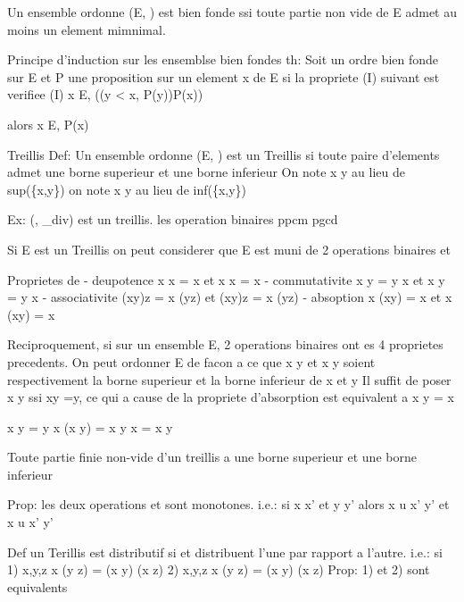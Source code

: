\documentclass{article}
\begin{document}
Un ensemble ordonne (E, \leq) est bien fonde ssi toute partie non vide de E admet au moins un element mimnimal.

Principe d'induction sur les ensemblse bien fondes
th: Soit \leq un ordre bien fonde sur E et P une proposition sur un element x de E
si la propriete (I) suivant est verifiee (I) \forall x \in E, ((\forall y < x, P(y))\rightarrow P(x))

alors \forall x \in E, P(x)



Treillis
Def: Un ensemble ordonne (E, \leq) est un Treillis si toute paire d'elements admet une borne superieur et une borne inferieur
On note x \sqcup y au lieu de sup(\{x,y\})
on note x \sqcap y au lieu de inf(\{x,y\})

Ex: (\N, \leq_{div}) est un treillis.
les operation binaires 
\sqcup ppcm
\sqcap pgcd
 


Si E est un Treillis on peut considerer que E est muni de 2 operations binaires \sqcup et \sqcap


Proprietes de \sqcap \sqcup
- deupotence x \sqcup x = x et x \sqcap x = x
- commutativite x \sqcup y = y \sqcup x et x \sqcap y = y \sqcap x
- associativite (x\sqcup y)\sqcup z = x \sqcup (y\sqcup z) et (x\sqcap y)\sqcap z = x \sqcap (y\sqcap z)
- absoption x \sqcap (x\sqcup y) = x et x \sqcup (x\sqcap y) = x

Reciproquement, si sur un ensemble E, 2 operations binaires ont es 4 proprietes precedents.
On peut ordonner E de facon a ce que x \sqcup y et x \sqcap y soient respectivement la borne superieur et la borne inferieur de x et y
Il suffit de poser x \leq y ssi x\sqcup y =y, ce qui a cause de la propriete d'absorption est equivalent a x \sqcap y = x

x \sqcup y = y \rightarrow x \sqcap (x \sqcup y) = x \sqcap y \rightarrow x = x \sqcap y

Toute partie finie non-vide d'un treillis a une borne superieur et une borne inferieur


Prop: les deux operations \sqcap et \sqcup sont monotones.
i.e.: 	si x \leq x' et y \leq y'
		alors x \sqcup u \leq x' \sqcup y'
			et x \sqcap u \leq x' \sqcap y'

Def un Terillis est distributif si \sqcap et \sqcup distribuent l'une par rapport a l'autre.
i.e.: si 
1) \forall x,y,z x \sqcup(y \sqcap z) = (x \sqcup y) \sqcap (x \sqcup z)
2) \forall x,y,z x \sqcap(y \sqcup z) = (x \sqcap y) \sqcup (x \sqcap z)
Prop: 1) et 2) sont equivalents
\end{document}

